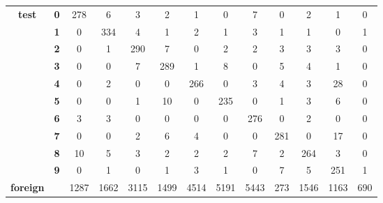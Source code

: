 \begin{table}[htp]
{\begin{tabular}{|c|c|c|c|c|c|c|c|c|c|c|c|c|}
		\multirow{10}{*}{\textbf{test}}     & \textbf{0} & 278        & 6          & 3          & 2          & 1          & 0          & 7          & 0          & 2          & 1          & 0                \\ \cline{2-13} 
		& \textbf{1} & 0          & 334        & 4          & 1          & 2          & 1          & 3          & 1          & 1          & 0          & 1                \\ \cline{2-13} 
		& \textbf{2} & 0          & 1          & 290        & 7          & 0          & 2          & 2          & 3          & 3          & 3          & 0                \\ \cline{2-13} 
		& \textbf{3} & 0          & 0          & 7          & 289        & 1          & 8          & 0          & 5          & 4          & 1          & 0                \\ \cline{2-13} 
		& \textbf{4} & 0          & 2          & 0          & 0          & 266        & 0          & 3          & 4          & 3          & 28         & 0                \\ \cline{2-13} 
		& \textbf{5} & 0          & 0          & 1          & 10         & 0          & 235        & 0          & 1          & 3          & 6          & 0                \\ \cline{2-13} 
		& \textbf{6} & 3          & 3          & 0          & 0          & 0          & 0          & 276        & 0          & 2          & 0          & 0                \\ \cline{2-13} 
		& \textbf{7} & 0          & 0          & 2          & 6          & 4          & 0          & 0          & 281        & 0          & 17         & 0                \\ \cline{2-13} 
		& \textbf{8} & 10         & 5          & 3          & 2          & 2          & 2          & 7          & 2          & 264        & 3          & 0                \\ \cline{2-13} 
		& \textbf{9} & 0          & 1          & 0          & 1          & 3          & 1          & 0          & 7          & 5          & 251        & 1                \\ \hline
		\textbf{foreign}                    & \textbf{}  & 1287       & 1662       & 3115       & 1499       & 4514       & 5191       & 5443       & 273        & 1546       & 1163       & 690              \\ \hline
	\end{tabular}
}
\end{table}

